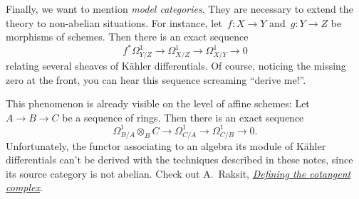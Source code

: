 \documentclass{amsart}
\theoremstyle{definition}
\theoremstyle{plain}
\theoremstyle{remark}
\newcommand{\?}{\,{:}\,}
\renewcommand{\_}{\mathpunct{.}\,}
\newcommand{\lra}{\longrightarrow}
\begin{document}
Finally, we want to mention \emph{model categories}. They are necessary to
extend the theory to non-abelian situations. For instance, let~$f : X \to Y$
and~$g : Y \to Z$ be morphisms of schemes. Then there is an exact sequence
\[ f^* \Omega^1_{Y/Z} \lra \Omega^1_{X/Z} \lra \Omega^1_{X/Y} \lra 0 \]
relating several sheaves of Kähler differentials. Of course, noticing the
missing zero at the front, you can hear this sequence screaming ``derive me!''.

This phenomenon is already visible on the level of affine schemes: Let~$A \to B
\to C$ be a sequence of rings. Then there is an exact sequence
\[ \Omega^1_{B/A} \otimes_B C \lra \Omega^1_{C/A} \lra \Omega^1_{C/B} \lra 0.
\]
Unfortunately, the functor associating to an algebra its module of Kähler
differentials can't be derived with the techniques described in these notes,
since its source category is not abelian. Check out A.~Raksit,
\href{http://www.arponr.com/files/quillen-cotangent.pdf}{\emph{Defining the
cotangent complex}}.
\end{document}
